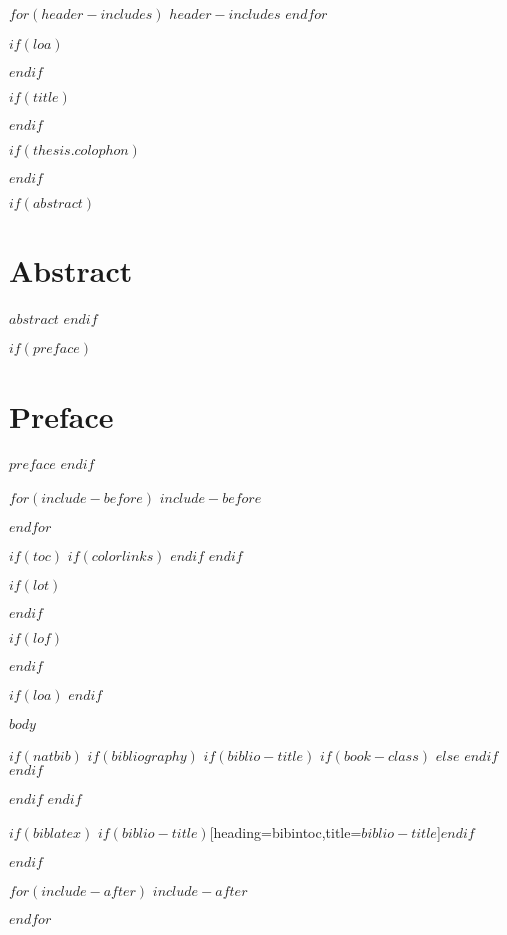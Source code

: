 $for(header-includes)$
  $header-includes$
$endfor$

$if(loa)$
\makeglossaries

$endif$



$if(title)$
\prefrontmatter

\cleartoevenpage

$endif$

$if(thesis.colophon)$

\cleartooddpage
$endif$

\frontmatter

$if(abstract)$
\chapter*{Abstract}
\setcounter{chapter}{0}
$abstract$
\clearforchapter
$endif$

$if(preface)$
\chapter*{Preface}
\setcounter{chapter}{0}
$preface$
\clearforchapter
$endif$

$for(include-before)$
$include-before$

$endfor$

$if(toc)$
{
$if(colorlinks)$
  \hypersetup{linkcolor=$if(toccolor)$$toccolor$$else$black$endif$}
$endif$
\setcounter{tocdepth}{$toc-depth$}
\tableofcontents
}
\clearforchapter
$endif$

$if(lot)$
\listoftables
\clearforchapter
$endif$

$if(lof)$
\listoffigures
\clearforchapter
$endif$

$if(loa)$
$endif$

\mainmatter
$body$

\backmatter
$if(natbib)$
  $if(bibliography)$
  $if(biblio-title)$
  $if(book-class)$
  \renewcommand\bibname{$biblio-title$}
  $else$
  \renewcommand\refname{$biblio-title$}
  $endif$
  $endif$
  

  $endif$
$endif$

$if(biblatex)$
\printbibliography$if(biblio-title)$[heading=bibintoc,title={$biblio-title$}]$endif$

$endif$

$for(include-after)$
$include-after$

$endfor$



